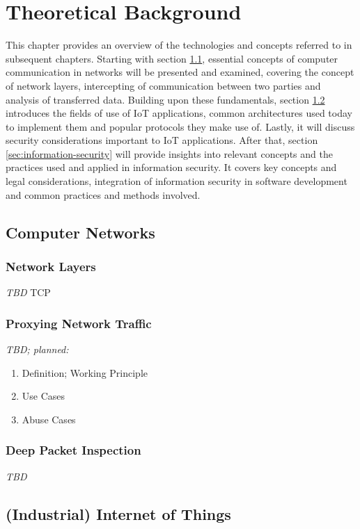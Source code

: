 \chapter{Theoretical Background}
\label{chap:theoretical-background}
This chapter provides an overview of the technologies and concepts referred to in subsequent chapters.
Starting with section \ref{sec:computer-networks}, essential concepts of computer communication in networks will be presented and examined, covering the concept of network layers, intercepting of communication between two parties and analysis of transferred data.
Building upon these fundamentals, section \ref{sec:internet-of-things} introduces the fields of use of \ac{IoT} applications, common architectures used today to implement them and popular protocols they make use of. Lastly, it will discuss security considerations important to \ac{IoT} applications.
After that, section \ref{sec:information-security} will provide insights into relevant concepts and the practices used and applied in information security. It covers key concepts and legal considerations, integration of information security in software development and common practices and methods involved.

\section{Computer Networks}
\label{sec:computer-networks}
\subsection{Network Layers}
\emph{TBD} %
\ac{TCP}

\subsection{Proxying Network Traffic}
\emph{TBD; planned:} %
\begin{enumerate}
    \item Definition; Working Principle
    \item Use Cases
    \item Abuse Cases
\end{enumerate}

\subsection{Deep Packet Inspection}
\emph{TBD} %

\section{(Industrial) Internet of Things}
\label{sec:internet-of-things}
